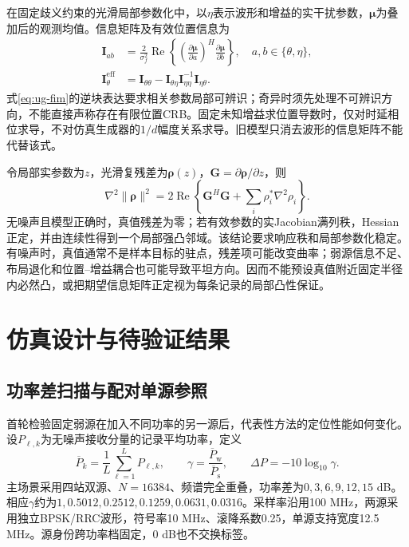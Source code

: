在固定歧义约束的光滑局部参数化中，以$\eta$表示波形和增益的实干扰参数，$\boldsymbol{\mu}$为叠加后的观测均值。信息矩阵及有效位置信息为
\begin{equation}\label{eq:ug-fim}
\begin{aligned}
\mathbf I_{ab}&=\frac{2}{\sigma_f^2}\operatorname{Re}
\left\{\left(\frac{\partial\boldsymbol{\mu}}{\partial a}\right)^H
\frac{\partial\boldsymbol{\mu}}{\partial b}\right\},\quad a,b\in\{\theta,\eta\},\\
\mathbf I_{\theta}^{\mathrm{eff}}&=\mathbf I_{\theta\theta}
-\mathbf I_{\theta\eta}\mathbf I_{\eta\eta}^{-1}\mathbf I_{\eta\theta}.
\end{aligned}
\end{equation}
式\eqref{eq:ug-fim}的逆块表达要求相关参数局部可辨识；奇异时须先处理不可辨识方向，不能直接声称存在有限位置CRB\cite{ref10}。固定未知增益求位置导数时，仅对时延相位求导，不对仿真生成器的$1/d$幅度关系求导。旧模型只消去波形的信息矩阵不能代替该式。

令局部实参数为$z$，光滑复残差为$\boldsymbol{\rho}(z)$，$\mathbf G=\partial\boldsymbol{\rho}/\partial z$，则
\begin{equation}\label{eq:ug-hessian}
\nabla^2\|\boldsymbol{\rho}\|^2
=2\operatorname{Re}\!\left\{\mathbf G^H\mathbf G
+\sum_i\rho_i^*\nabla^2\rho_i\right\}.
\end{equation}
无噪声且模型正确时，真值残差为零；若有效参数的实Jacobian满列秩，Hessian正定，并由连续性得到一个局部强凸邻域。该结论要求响应秩和局部参数化稳定。有噪声时，真值通常不是样本目标的驻点，残差项可能改变曲率；弱源信息不足、布局退化和位置--增益耦合也可能导致平坦方向。因而不能预设真值附近固定半径内必然凸，或把期望信息矩阵正定视为每条记录的局部凸性保证。

\section{仿真设计与待验证结果}\label{sec:ug-experiments}
\subsection{功率差扫描与配对单源参照}\label{sec:ug-protocol}
首轮检验固定弱源在加入不同功率的另一源后，代表性方法的定位性能如何变化。设$P_{\ell,k}$为无噪声接收分量的记录平均功率，定义
\begin{equation}\label{eq:ug-gamma}
\overline P_k=\frac1L\sum_{\ell=1}^LP_{\ell,k},\qquad
\gamma=\frac{\overline P_{\mathrm w}}{\overline P_{\mathrm s}},\qquad
\Delta P=-10\log_{10}\gamma.
\end{equation}
主场景采用四站双源、$N=16384$、频谱完全重叠，功率差为$0,3,6,9,12,15$ dB。相应$\gamma$约为$1,0.5012,0.2512,0.1259,0.0631,0.0316$。采样率沿用100 MHz，两源采用独立BPSK/RRC波形，符号率10 MHz、滚降系数0.25，单源支持宽度12.5 MHz。源身份跨功率档固定，0 dB也不交换标签。


